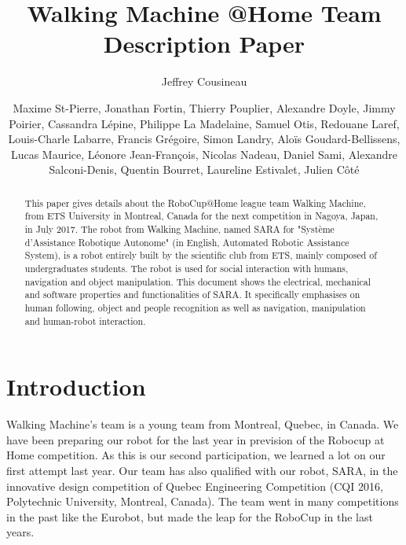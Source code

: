 \documentclass[runningheads,a4paper]{llncs}
\begin{document}
\title{Walking Machine @Home  Team Description Paper}

\author{Jeffrey Cousineau \and Maxime St-Pierre, Jonathan Fortin, Thierry Pouplier, Alexandre Doyle, Jimmy Poirier, Cassandra Lépine, Philippe La Madelaine, Samuel Otis, Redouane Laref, Louis-Charle Labarre, Francis Grégoire, Simon Landry, Aloïs Goudard-Bellissens, Lucas Maurice, Léonore Jean-François, Nicolas Nadeau, Daniel Sami, Alexandre Salconi-Denis, Quentin Bourret, Laureline Estivalet, Julien Côté }
\maketitle



\begin{abstract}

This paper gives details about the RoboCup@Home league team Walking Machine, from ETS University in Montreal, Canada for the next competition in Nagoya, Japan, in July 2017. The robot from Walking Machine, named SARA for "Système d’Assistance Robotique Autonome" (in English, Automated Robotic Assistance System), is a robot entirely built by the scientific club from ETS, mainly composed of undergraduates students. The robot is used for social interaction with humans, navigation and object manipulation. This document shows the electrical, mechanical and software properties and functionalities of SARA. It specifically emphasises on human following, object and people recognition as well as navigation, manipulation and human-robot interaction.

\end{abstract}



\section{Introduction}
\tab Walking Machine’s team is a young team from Montreal, Quebec, in Canada. We have been preparing our robot for the last year in prevision of the Robocup at Home competition. As this is our second participation, we learned a lot on our first attempt last year. Our team has also qualified with our robot, SARA, in the innovative design competition of Quebec Engineering Competition (CQI 2016, Polytechnic University, Montreal, Canada). The team went in many competitions in the past like the Eurobot, but made the leap for the RoboCup in the last years. \\
\end{document}
